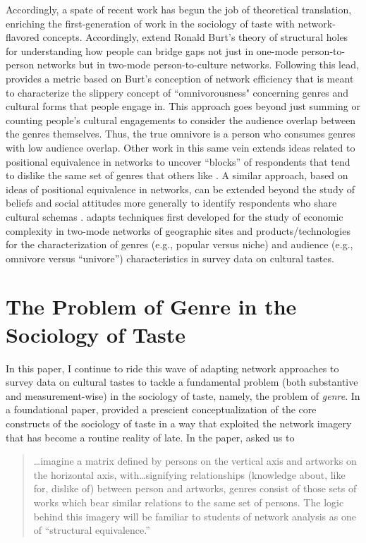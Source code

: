 \documentclass[a4paper,12pt]{extarticle}
\begin{document}
Accordingly, a spate of recent work has begun the job of theoretical translation, enriching the first-generation of work in the sociology of taste with network-flavored concepts. Accordingly, \citet{pachucki2010cultural} extend Ronald Burt's theory of structural holes for understanding how people can bridge gaps not just in one-mode person-to-person networks but in two-mode person-to-culture networks. Following this lead, \citet{lizardo14} provides a metric based on Burt's conception of network efficiency that is meant to characterize the slippery concept of ``omnivorousness" concerning genres and cultural forms that people engage in. This approach goes beyond just summing or counting people's cultural engagements to consider the audience overlap between the genres themselves. Thus, the true omnivore is a person who consumes genres with low audience overlap. Other work in this same vein extends ideas related to positional equivalence in networks \citet{breiger1976social} to uncover ``blocks'' of respondents that tend to dislike the same set of genres that others like \citep{okada2017structure}. A similar approach, based on ideas of positional equivalence in networks, can be extended beyond the study of beliefs and social attitudes more generally to identify respondents who share cultural schemas \citep{goldberg2011mapping}. \citet{lizardo18} adapts techniques first developed for the study of economic complexity in two-mode networks of geographic sites and products/technologies for the characterization of genres (e.g., popular versus niche) and audience (e.g., omnivore versus ``univore'') characteristics in survey data on cultural tastes. 

\section{The Problem of Genre in the Sociology of Taste}
In this paper, I continue to ride this wave of adapting network approaches to survey data on cultural tastes to tackle a fundamental problem (both substantive and measurement-wise) in the sociology of taste, namely, the problem of \textit{genre}. In a foundational paper, \citet{dimaggio1987classification} provided a prescient conceptualization of the core constructs of the sociology of taste in a way that exploited the network imagery that has become a routine reality of late. In the paper, \citet[244]{dimaggio1987classification} asked us to

\begin{quote}
   {\dots}imagine a matrix defined by persons on the vertical axis and artworks on the horizontal axis, with{\dots}signifying relationships (knowledge about, like for, dislike of) between person and artworks, genres consist of those sets of works which bear similar relations to the same set of persons. The logic behind this imagery will be familiar to students of network analysis as one of ``structural equivalence.''
\end{quote}
\end{document}
